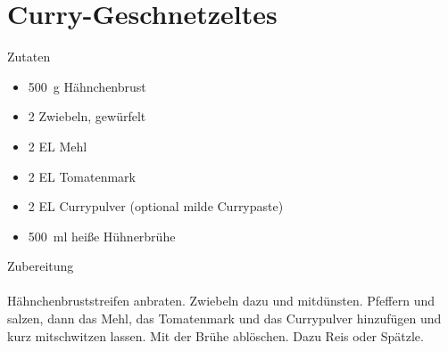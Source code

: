 \section*{Curry-Geschnetzeltes}
\ihead{}\ohead{}
\cfoot{}
{\Large Zutaten}
\begin{multicols}{2}
\begin{itemize}
    \item \SI{500}{g} Hähnchenbrust
    \item \num{2} Zwiebeln, gewürfelt
    \item \num{2} EL Mehl
    \item \num{2} EL Tomatenmark
    \item \num{2} EL Currypulver (optional milde Currypaste)
    \item \SI{500}{ml} heiße Hühnerbrühe
\end{itemize}
\end{multicols}
\noindent
{\Large Zubereitung}\\
\\
Hähnchenbruststreifen anbraten.
Zwiebeln dazu und mitdünsten.
Pfeffern und salzen, dann das Mehl, das Tomatenmark und das Currypulver hinzufügen und kurz mitschwitzen lassen.
Mit der Brühe ablöschen. 
Dazu Reis oder Spätzle.
